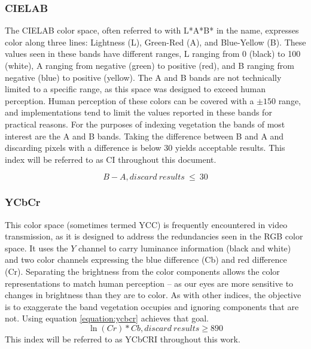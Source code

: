 \documentclass[letterpaper]{report}
\begin{document}
{\subsubsection{CIELAB}
The CIELAB color space, often referred to with L*A*B* in the name, expresses color along three lines: Lightness (L), Green-Red (A), and Blue-Yellow (B). These values seen in these bands have different ranges, L ranging from 0 (black) to 100 (white), A ranging from negative (green) to positive (red), and B ranging from negative (blue) to positive (yellow). The A and B bands are not technically limited to a specific range, as this space was designed to exceed human perception. Human perception of these colors can be covered with a $\pm 150$ range, and implementations tend to limit the values reported in these bands for practical reasons.  For the purposes of indexing vegetation the bands of  most interest are the A and B bands. Taking the difference between B and A and discarding pixels with a difference is below 30 yields acceptable results. This index will be referred to as CI throughout this document.

\begin{equation}
		\label{equation:cielab}
		B - A, discard~results~\leq~30
\end{equation}

\subsubsection{YCbCr}
This color space (sometimes termed YCC) is frequently encountered in video transmission, as it is designed to address the redundancies seen in the RGB color space. It uses the $Y$ channel to carry luminance information (black and white) and two color channels expressing the blue difference (Cb) and red difference (Cr). Separating the brightness from the color components allows the color representations to match human perception -- as our eyes are more sensitive to changes in brightness than they are to color. As with other indices, the objective is to exaggerate the band vegetation occupies and ignoring components that are not. Using equation \ref{equation:ycbcr} achieves that goal.
\begin{equation}
	\label{equation:ycbcr}
	\ln(Cr) * Cb, discard\ results\geq 890
\end{equation}
This index will be referred to as YCbCRI throughout this work.

}
\end{document}
